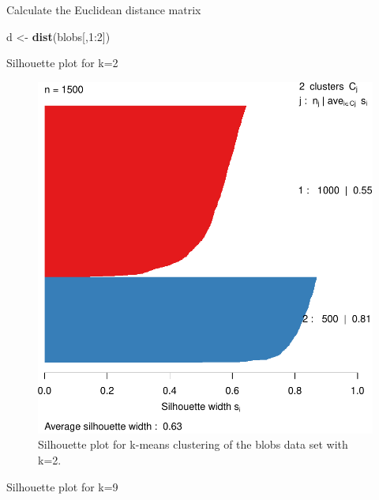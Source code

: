 \documentclass[]{book}
\newenvironment{Shaded}{\begin{snugshade}}{\end{snugshade}}
\newcommand{\KeywordTok}[1]{\textcolor[rgb]{0.13,0.29,0.53}{\textbf{{#1}}}}
\newcommand{\DataTypeTok}[1]{\textcolor[rgb]{0.13,0.29,0.53}{{#1}}}
\newcommand{\DecValTok}[1]{\textcolor[rgb]{0.00,0.00,0.81}{{#1}}}
\newcommand{\StringTok}[1]{\textcolor[rgb]{0.31,0.60,0.02}{{#1}}}
\newcommand{\OtherTok}[1]{\textcolor[rgb]{0.56,0.35,0.01}{{#1}}}
\newcommand{\NormalTok}[1]{{#1}}
\theoremstyle{definition}
\theoremstyle{definition}
\theoremstyle{definition}
\theoremstyle{remark}
\begin{document}
Calculate the Euclidean distance matrix

\begin{Shaded}
\begin{Highlighting}[]
\NormalTok{d <-}\StringTok{ }\KeywordTok{dist}\NormalTok{(blobs[,}\DecValTok{1}\NormalTok{:}\DecValTok{2}\NormalTok{])}
\end{Highlighting}
\end{Shaded}

Silhouette plot for k=2

\begin{Shaded}
\end{Shaded}

\begin{figure}

{\centering \includegraphics[width=0.6\linewidth]{09-clustering_files/figure-latex/silhouetteK2-1} 

}

\caption{Silhouette plot for k-means clustering of the blobs data set with k=2.}\label{fig:silhouetteK2}
\end{figure}

Silhouette plot for k=9

\begin{Shaded}
\end{Shaded}
\end{document}
